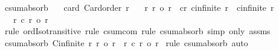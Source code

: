 \begin{isabellebody}
\endisatagproof
{\isafoldproof}%
%
\isadelimproof
\isanewline
%
\endisadelimproof
\isanewline
{}\isamarkupfalse%
\ csum{\isacharunderscore}{\kern0pt}absorb{}{\isacharprime}{\kern0pt}{\isacharcolon}{\kern0pt}\isanewline
\ \ \ card{\isacharcolon}{\kern0pt}\ {\isachardoublequoteopen}Card{\isacharunderscore}{\kern0pt}order\ r{}{\isachardoublequoteclose}\isanewline
\ \ \ r{}{}{\isacharcolon}{\kern0pt}\ {\isachardoublequoteopen}r{}\ {\isasymle}o\ r{}{\isachardoublequoteclose}\ \ cr{}{}{\isacharcolon}{\kern0pt}\ {\isachardoublequoteopen}cinfinite\ r{}\ {\isasymor}\ cinfinite\ r{}{\isachardoublequoteclose}\isanewline
\ \ \ {\isachardoublequoteopen}r{}\ {\isacharplus}{\kern0pt}c\ r{}\ {\isacharequal}{\kern0pt}o\ r{}{\isachardoublequoteclose}\isanewline
%
\isadelimproof
%
\endisadelimproof
%
\isatagproof
{}\isamarkupfalse%
\ {\isacharparenleft}{\kern0pt}rule\ ordIso{\isacharunderscore}{\kern0pt}transitive{\isacharcomma}{\kern0pt}\ rule\ csum{\isacharunderscore}{\kern0pt}com{\isacharcomma}{\kern0pt}\ rule\ csum{\isacharunderscore}{\kern0pt}absorb{}{\isacharprime}{\kern0pt}{\isacharcomma}{\kern0pt}\ {\isacharparenleft}{\kern0pt}simp\ only{\isacharcolon}{\kern0pt}\ assms{\isacharparenright}{\kern0pt}{\isacharplus}{\kern0pt}{\isacharparenright}{\kern0pt}%
\endisatagproof
{\isafoldproof}%
%
\isadelimproof
\isanewline
%
\endisadelimproof
\isanewline
{}\isamarkupfalse%
\ csum{\isacharunderscore}{\kern0pt}absorb{}{\isacharcolon}{\kern0pt}\ {\isachardoublequoteopen}{\isasymlbrakk}Cinfinite\ r{}{\isacharsemicolon}{\kern0pt}\ r{}\ {\isasymle}o\ r{}{\isasymrbrakk}\ {\isasymLongrightarrow}\ r{}\ {\isacharplus}{\kern0pt}c\ r{}\ {\isacharequal}{\kern0pt}o\ r{}{\isachardoublequoteclose}\isanewline
%
\isadelimproof
%
\endisadelimproof
%
\isatagproof
{}\isamarkupfalse%
\ {\isacharparenleft}{\kern0pt}rule\ csum{\isacharunderscore}{\kern0pt}absorb{}{\isacharprime}{\kern0pt}{\isacharparenright}{\kern0pt}\ auto%
\endisatagproof
{\isafoldproof}%
%
\isadelimproof
%
\endisadelimproof
%
\isadelimdocument
%
\endisadelimdocument
%
\isatagdocument
%
\isamarkuptrue%
%
\endisatagdocument
{\isafolddocument}%
%
\isadelimdocument
%
\endisadelimdocument
{}\isamarkupfalse%

\end{isabellebody}
